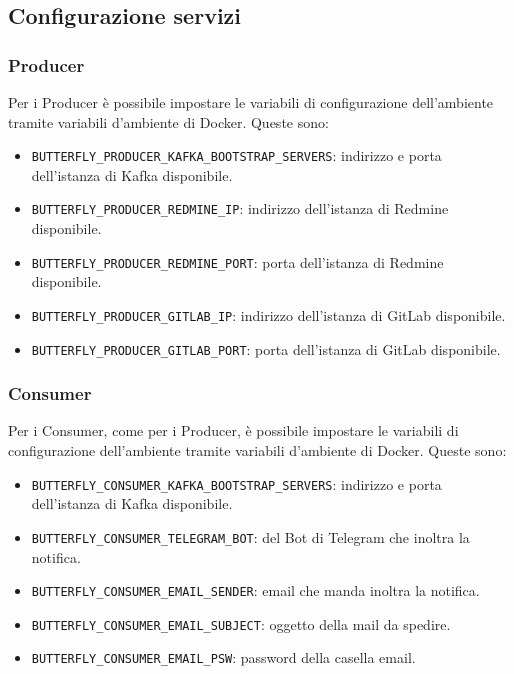 \subsection{Configurazione servizi \progetto}\label{var}

	\subsubsection{Producer}
	Per i Producer è possibile impostare le variabili di configurazione dell'ambiente tramite variabili d'ambiente di Docker. Queste sono:
	\begin{itemize}
		\item\texttt{BUTTERFLY\_PRODUCER\_KAFKA\_BOOTSTRAP\_SERVERS}: indirizzo e porta dell'istanza di Kafka disponibile.
		\item\texttt{BUTTERFLY\_PRODUCER\_REDMINE\_IP}: indirizzo dell'istanza di Redmine disponibile.
		\item\texttt{BUTTERFLY\_PRODUCER\_REDMINE\_PORT}: porta dell'istanza di Redmine disponibile.
		\item\texttt{BUTTERFLY\_PRODUCER\_GITLAB\_IP}: indirizzo dell'istanza di GitLab disponibile.
		\item\texttt{BUTTERFLY\_PRODUCER\_GITLAB\_PORT}: porta dell'istanza di GitLab disponibile.
	\end{itemize}

	\subsubsection{Consumer}\label{var_consumer}
	Per i Consumer, come per i Producer, è possibile impostare le variabili di configurazione dell'ambiente tramite variabili d'ambiente di Docker.
	Queste sono:
	\begin{itemize}
		\item\texttt{BUTTERFLY\_CONSUMER\_KAFKA\_BOOTSTRAP\_SERVERS}: indirizzo e porta dell'istanza di Kafka disponibile.
		\item\texttt{BUTTERFLY\_CONSUMER\_TELEGRAM\_BOT}:  del Bot di Telegram che inoltra la notifica.
		\item\texttt{BUTTERFLY\_CONSUMER\_EMAIL\_SENDER}: email che manda inoltra la notifica.
		\item\texttt{BUTTERFLY\_CONSUMER\_EMAIL\_SUBJECT}: oggetto della mail da spedire.
		\item\texttt{BUTTERFLY\_CONSUMER\_EMAIL\_PSW}: password della casella email.
	\end{itemize}


